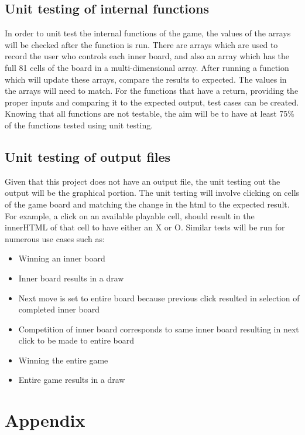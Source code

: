 \documentclass[12pt, titlepage]{article}
\begin{document}
\subsection{Unit testing of internal functions}
In order to unit test the internal functions of the game, the values of the
arrays will be checked after the function is run. There are arrays which are
used to record the user who controls each inner board, and also an array which
has the full 81 cells of the board in a multi-dimensional array. After running
a function which will update these arrays, compare the results to expected.
The values in the arrays will need to match. For the functions that have a
return, providing the proper inputs and comparing it to the expected output,
test cases can be created. Knowing that all functions are not testable, the
aim will be to have at least 75\% of the functions tested using unit testing.
\subsection{Unit testing of output files}		
Given that this project does not have an output file, the unit testing out the
output will be the graphical portion. The unit testing will involve clicking
on cells of the game board and matching the change in the html to the expected
result. For example, a click on an available playable cell, should result in
the innerHTML of that cell to have either an X or O. Similar tests will be run
for numerous use cases such as:
\begin{itemize}
\item
Winning an inner board
\item
Inner board results in a draw
\item
Next move is set to entire board because previous click resulted in selection
of completed inner board
\item
Competition of inner board corresponds to same inner board resulting in next
click to be made to entire board
\item
Winning the entire game
\item
Entire game results in a draw
\end{itemize}




\newpage

\section{Appendix}
\end{document}
